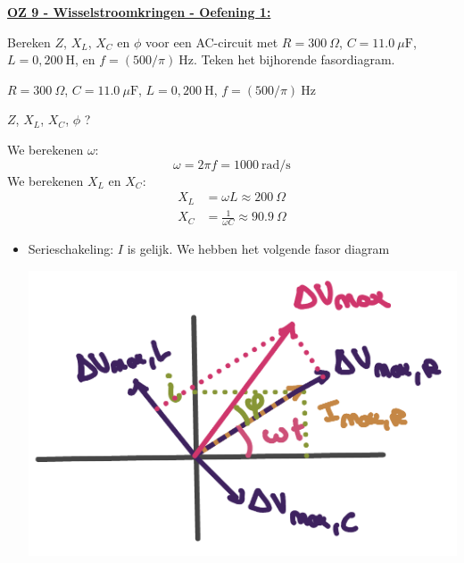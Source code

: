 \textbf{\underline{OZ 9 - Wisselstroomkringen - Oefening 1:}}
\vspace{0.5cm}

Bereken $Z$, $X_L$, $X_C$ en $\phi$ voor een AC-circuit met $R = 300 \ \Omega$, $C = 11.0 \ \mu\text{F}$, $L = 0,200 \ \text{H}$, en $f = (500/\pi) \ \text{Hz}$. Teken het bijhorende fasordiagram.


\begin{description}[labelwidth=1.5cm, leftmargin=!]
    \item[Geg. :]  $R = 300 \ \Omega$, $C = 11.0 \ \mu\text{F}$, $L = 0,200 \ \text{H}$, $f = (500/\pi) \ \text{Hz}$ 
    \item[Gevr. :] $Z$, $X_L$, $X_C$, $\phi$ ?
    \item[Opl. :]   
        We berekenen $\omega$:
        \begin{equation*}
            \omega = 2\pi f = 1000 \ \text{rad/s}
        \end{equation*}
        We berekenen $X_L$ en $X_C$:
        \begin{align*}
            X_L &= \omega L \approx 200 \ \Omega \\ X_C &= \frac{1}{\omega C} \approx 90.9 \ \Omega
        \end{align*}
        \begin{itemize}
            \item Serieschakeling: $I$ is gelijk. We hebben het volgende fasor diagram
                \begin{center}
                    \includegraphics[scale=0.3]{oz09/resources/Oz9Oef1-serie.png}

\end{center}
\end{itemize}
\end{description}
